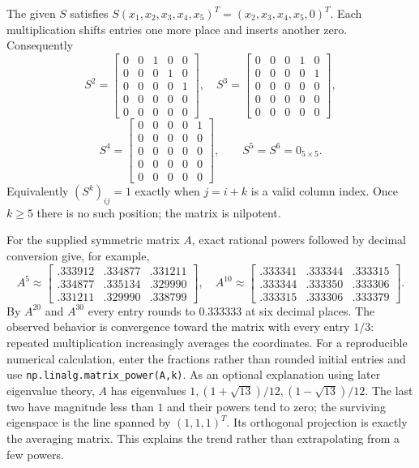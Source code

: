 The given $S$ satisfies $S(x_1,x_2,x_3,x_4,x_5)^T=(x_2,x_3,x_4,x_5,0)^T$.
Each multiplication shifts entries one more place and inserts another zero.
Consequently
\[
 S^2=\begin{bmatrix}0&0&1&0&0\\0&0&0&1&0\\0&0&0&0&1\\0&0&0&0&0\\0&0&0&0&0\end{bmatrix},\quad
 S^3=\begin{bmatrix}0&0&0&1&0\\0&0&0&0&1\\0&0&0&0&0\\0&0&0&0&0\\0&0&0&0&0\end{bmatrix},
\]
\[
 S^4=\begin{bmatrix}0&0&0&0&1\\0&0&0&0&0\\0&0&0&0&0\\0&0&0&0&0\\0&0&0&0&0\end{bmatrix},\qquad
 S^5=S^6=0_{5\times5}.
\]
Equivalently $(S^k)_{ij}=1$ exactly when $j=i+k$ is a valid column index.
Once $k\ge5$ there is no such position; the matrix is nilpotent.

For the supplied symmetric matrix $A$, exact rational powers followed by
decimal conversion give, for example,
\[
 A^5\approx\begin{bmatrix}
 .333912&.334877&.331211\\.334877&.335134&.329990\\
 .331211&.329990&.338799\end{bmatrix},\quad
 A^{10}\approx\begin{bmatrix}
 .333341&.333344&.333315\\.333344&.333350&.333306\\
 .333315&.333306&.333379\end{bmatrix}.
\]
By $A^{20}$ and $A^{30}$ every entry rounds to $0.333333$ at six decimal
places. The observed behavior is convergence toward the matrix with every
entry $1/3$: repeated multiplication increasingly averages the coordinates.
For a reproducible numerical calculation, enter the fractions rather than
rounded initial entries and use \texttt{np.linalg.matrix\_power(A,k)}.
As an optional explanation using later eigenvalue theory, $A$ has eigenvalues
$1,(1+\sqrt{13})/12,(1-\sqrt{13})/12$. The last two have magnitude less
than $1$ and their powers tend to zero; the surviving eigenspace is the line
spanned by $(1,1,1)^T$. Its orthogonal projection is exactly the averaging
matrix. This explains the trend rather than extrapolating from a few powers.
